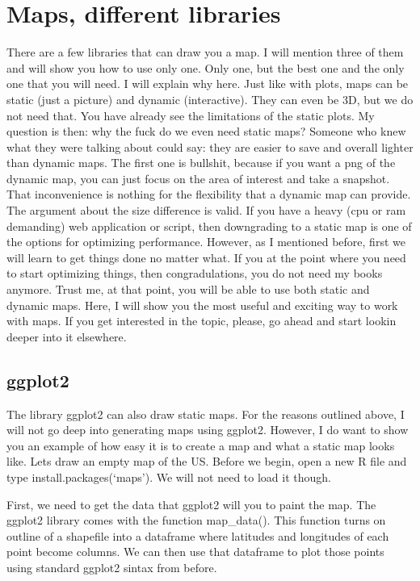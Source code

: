 \documentclass[]{book}
\begin{document}
\hypertarget{maps-different-libraries}{%
\section{Maps, different libraries}\label{maps-different-libraries}}

There are a few libraries that can draw you a map. I will mention three of them and will show you how to use only one. Only one, but the best one and the only one that you will need. I will explain why here. Just like with plots, maps can be static (just a picture) and dynamic (interactive). They can even be 3D, but we do not need that. You have already see the limitations of the static plots. My question is then: why the fuck do we even need static maps? Someone who knew what they were talking about could say: they are easier to save and overall lighter than dynamic maps. The first one is bullshit, because if you want a png of the dynamic map, you can just focus on the area of interest and take a snapshot. That inconvenience is nothing for the flexibility that a dynamic map can provide. The argument about the size difference is valid. If you have a heavy (cpu or ram demanding) web application or script, then downgrading to a static map is one of the options for optimizing performance. However, as I mentioned before, first we will learn to get things done no matter what. If you at the point where you need to start optimizing things, then congradulations, you do not need my books anymore. Trust me, at that point, you will be able to use both static and dynamic maps. Here, I will show you the most useful and exciting way to work with maps. If you get interested in the topic, please, go ahead and start lookin deeper into it elsewhere.

\hypertarget{ggplot2}{%
\subsection{ggplot2}\label{ggplot2}}

The library ggplot2 can also draw static maps. For the reasons outlined above, I will not go deep into generating maps using ggplot2. However, I do want to show you an example of how easy it is to create a map and what a static map looks like. Lets draw an empty map of the US. Before we begin, open a new R file and type install.packages(`maps'). We will not need to load it though.

First, we need to get the data that ggplot2 will you to paint the map. The ggplot2 library comes with the function map\_data(). This function turns on outline of a shapefile into a dataframe where latitudes and longitudes of each point become columns. We can then use that dataframe to plot those points using standard ggplot2 sintax from before.
\end{document}
